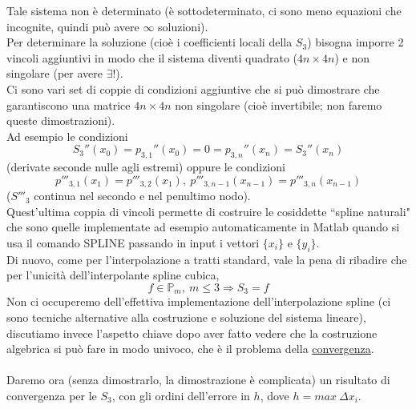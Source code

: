 \documentclass[12pt,a4paper]{article}
\begin{document}
Tale sistema non è determinato (è sottodeterminato, ci sono meno equazioni che incognite, quindi può avere $\infty$ soluzioni).\\
Per determinare la soluzione (cioè i coefficienti locali della $S_3$) bisogna imporre 2 vincoli aggiuntivi in modo che il sistema diventi quadrato ($4n \times 4n$) e non singolare (per avere $\exists!$).\\
Ci sono vari set di coppie di condizioni  aggiuntive che si può dimostrare che garantiscono una matrice $4n \times 4n$ non singolare (cioè invertibile; non faremo queste dimostrazioni).\\
Ad esempio le condizioni 
\begin{equation*}
    S_3''(x_0)=p_{3,1}''(x_0)=0=p_{3,n}''(x_n)=S_3''(x_n)
\end{equation*}
(derivate seconde nulle agli estremi) oppure le condizioni
\[
p'''_{3,1}(x_1) = p'''_{3,2}(x_1), \ p'''_{3,n-1}(x_{n-1}) = p'''_{3,n} (x_{n-1})
\]
($S'''_3$ continua nel secondo e nel penultimo nodo).\\
Quest'ultima coppia di vincoli permette di costruire le cosiddette ``spline naturali" che sono quelle implementate ad esempio automaticamente in Matlab quando si usa il comando SPLINE passando in input i vettori $\{x_i \}$ e $\{ y_i \}$.\\
Di nuovo, come per l'interpolazione a tratti standard, vale la pena di ribadire che per l'unicità dell'interpolante spline cubica,
\[
f \in \mathbb{P}_m, \ m \leq 3 \Rightarrow S_3 = f
\]
Non ci occuperemo dell'effettiva implementazione dell'interpolazione spline (ci sono tecniche alternative alla costruzione e soluzione del sistema lineare), discutiamo invece l'aspetto chiave dopo aver fatto vedere che la costruzione algebrica si può fare in modo univoco, che è il problema della \uline{convergenza}.\\\\
Daremo ora (senza dimostrarlo, la dimostrazione è complicata) un risultato di convergenza per le $S_3$, con gli ordini dell'errore in $h$, dove $h = max \ \Delta x_i$.
\end{document}
